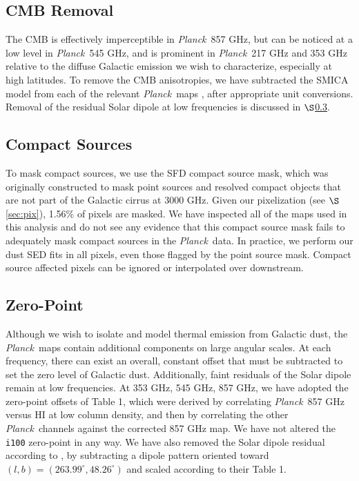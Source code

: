 \documentclass{emulateapj}
\newcommand{\PLANCK}{{\it Planck}}
\begin{document}
\subsection{CMB Removal}
The CMB is effectively imperceptible in \PLANCK~857 GHz, but can be noticed at 
a low level in \PLANCK~545 GHz, and is prominent in \PLANCK~217 GHz and 353 
GHz relative to the diffuse Galactic emission we wish to characterize, 
especially at high latitudes. To remove the CMB anisotropies, we have 
subtracted the SMICA model from each of the relevant \PLANCK~maps 
\citep{smica}, after appropriate unit conversions. Removal of the residual 
Solar dipole at low frequencies is discussed in $\S$\ref{sec:zp}.

\subsection{Compact Sources}
To mask compact sources, we use the SFD compact source mask, which was 
originally constructed to mask point sources and resolved compact objects
that are not part of the Galactic cirrus at 3000 GHz. Given our pixelization 
(see $\S$\ref{sec:pix}), 1.56\% of pixels are masked. We have inspected all of 
the maps used in this analysis and do not see any evidence that this compact 
source mask fails to adequately mask compact sources in the \PLANCK~data. In 
practice, we perform our dust SED fits in all pixels, even those flagged by 
the point source mask. Compact source affected pixels can be ignored or 
interpolated over downstream.

\subsection{Zero-Point}
\label{sec:zp}
Although we wish to isolate and model thermal emission from Galactic dust, the
\PLANCK~maps contain additional components on large angular scales. At each 
frequency, there can exist an overall, constant offset that must be subtracted 
to set the zero level of Galactic dust. Additionally, faint residuals of the 
Solar dipole remain at low frequencies. At 353 GHz, 545 GHz, 857 GHz, we have 
adopted the zero-point offsets of \cite{planckdust} Table 1, which were derived
 by correlating \PLANCK~857 GHz versus HI at low column density, and then by 
correlating the other \PLANCK~channels against the corrected 857 GHz map. We 
have not altered the \verb|i100| zero-point in any way. We have also removed 
the Solar dipole residual according to \cite{planckdust}, by subtracting a 
dipole pattern oriented toward $(l, b) = (263.99^{\circ}, 48.26^{\circ})$ and 
scaled according to their Table 1.
\end{document}
